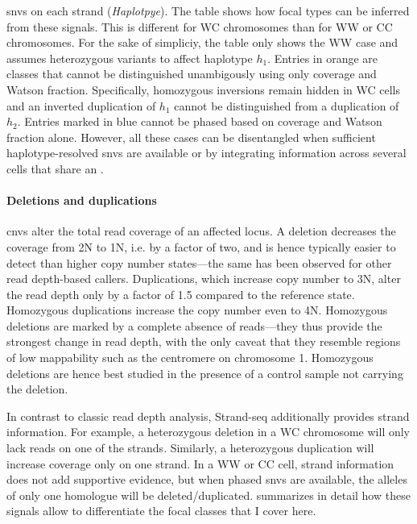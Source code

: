 \begin{table}[t]
{    \acp{snv} on each strand (\emph{Haplotpye}). The table shows how
    focal \sv types can be inferred from these signals. This is different
    for WC chromosomes than for WW or CC chromosomes. For the sake of simpliciy,
    the table only shows the WW case and assumes heterozygous variants to affect
    haplotype $h_1$. Entries in orange are \sv classes that cannot be
    distinguished unambigously using only coverage and Watson fraction.
    Specifically, homozygous inversions remain hidden in WC cells and an
    inverted duplication of $h_1$ cannot be distinguished from a duplication of
    $h_2$. Entries marked in blue cannot be phased based on coverage and Watson
    fraction alone. However, all these cases can be disentangled when
    sufficient haplotype-resolved \acp{snv} are available or by integrating information
    across several cells that share an \sv.}
\end{table}

\paragraph{Deletions and duplications}
\Acp{cnv} alter the total read coverage of an affected locus. A deletion
decreases the coverage from 2N to 1N, i.e. by a factor of two, and is hence
typically easier to detect than higher copy number states---the same has been observed for other read
depth-based \sv callers. Duplications, which increase copy number to 3N, alter
the read depth only by a factor of 1.5 compared to the reference state.
Homozygous duplications increase the copy number even to 4N. Homozygous
deletions are marked by a complete absence of reads---they thus provide the
strongest change in read depth, with the only caveat that they resemble regions
of low mappability such as the centromere on chromosome 1. Homozygous deletions
are hence best studied in the presence of a control sample not carrying
the deletion.

In contrast to classic read depth analysis, Strand-seq additionally provides
strand information. For example, a heterozygous deletion in a WC chromosome will
only lack reads on one of the strands. Similarly, a heterozygous duplication
will increase coverage only on one strand. In a WW or CC cell, strand
information does not add supportive evidence, but when phased \acp{snv} are
available, the alleles of only one homologue will be deleted/duplicated.
 summarizes in detail how these signals
allow to differentiate the focal \sv classes that I cover here.

